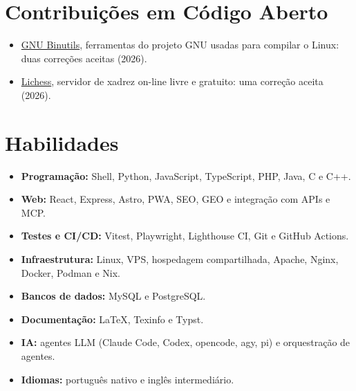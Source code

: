 \documentclass[a4paper,11pt]{article}
\begin{document}

\section{Contribuições em Código Aberto}
\begin{itemize}
  \item \href{https://patchwork.sourceware.org/project/binutils/list/?submitter=37677}%
  {GNU Binutils}, ferramentas do projeto GNU usadas para compilar o Linux:
  duas correções aceitas (2026).
  \item \href{https://github.com/lichess-org/lila/pull/21832}{Lichess},
  servidor de xadrez on-line livre e gratuito: uma correção aceita (2026).
\end{itemize}


\section{Habilidades}
\begin{itemize}
  \item \textbf{Programação:} Shell, Python, JavaScript, TypeScript, PHP, Java,
  C e C++.
  \item \textbf{Web:} React, Express, Astro, PWA, SEO, GEO e integração com
  APIs e MCP.
  \item \textbf{Testes e CI/CD:} Vitest, Playwright, Lighthouse CI, Git e
  GitHub Actions.
  \item \textbf{Infraestrutura:} Linux, VPS, hospedagem compartilhada, Apache,
  Nginx, Docker, Podman e Nix.
  \item \textbf{Bancos de dados:} MySQL e PostgreSQL.
  \item \textbf{Documentação:} \LaTeX{}, Texinfo e Typst.
  \item \textbf{IA:} agentes LLM (Claude Code, Codex, opencode, agy, pi) e
  orquestração de agentes.
  \item \textbf{Idiomas:} português nativo e inglês intermediário.
\end{itemize}

\end{document}
